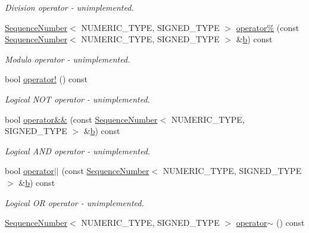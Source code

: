 \begin{DoxyCompactItemize}
\begin{DoxyCompactList}\small\item\em Division operator -\/ unimplemented. \end{DoxyCompactList}\item 
\hyperlink{classns3_1_1SequenceNumber}{Sequence\+Number}$<$ N\+U\+M\+E\+R\+I\+C\+\_\+\+T\+Y\+PE, S\+I\+G\+N\+E\+D\+\_\+\+T\+Y\+PE $>$ \hyperlink{classns3_1_1SequenceNumber_ad27e0fd1a90b3499278f7fac1d0db06f}{operator\%} (const \hyperlink{classns3_1_1SequenceNumber}{Sequence\+Number}$<$ N\+U\+M\+E\+R\+I\+C\+\_\+\+T\+Y\+PE, S\+I\+G\+N\+E\+D\+\_\+\+T\+Y\+PE $>$ \&\hyperlink{lte__pathloss_8m_a21ad0bd836b90d08f4cf640b4c298e7c}{b}) const 
\begin{DoxyCompactList}\small\item\em Modulo operator -\/ unimplemented. \end{DoxyCompactList}\item 
bool \hyperlink{classns3_1_1SequenceNumber_a31acb0e79a7312eaf3c673af43c63b79}{operator!} () const 
\begin{DoxyCompactList}\small\item\em Logical N\+OT operator -\/ unimplemented. \end{DoxyCompactList}\item 
bool \hyperlink{classns3_1_1SequenceNumber_a62dcb5534ac30aa137815a3ae462dc16}{operator\&\&} (const \hyperlink{classns3_1_1SequenceNumber}{Sequence\+Number}$<$ N\+U\+M\+E\+R\+I\+C\+\_\+\+T\+Y\+PE, S\+I\+G\+N\+E\+D\+\_\+\+T\+Y\+PE $>$ \&\hyperlink{lte__pathloss_8m_a21ad0bd836b90d08f4cf640b4c298e7c}{b}) const 
\begin{DoxyCompactList}\small\item\em Logical A\+ND operator -\/ unimplemented. \end{DoxyCompactList}\item 
bool \hyperlink{classns3_1_1SequenceNumber_a9a48c4ad94843cf7d5ee9f3d6580a1e8}{operator$\vert$$\vert$} (const \hyperlink{classns3_1_1SequenceNumber}{Sequence\+Number}$<$ N\+U\+M\+E\+R\+I\+C\+\_\+\+T\+Y\+PE, S\+I\+G\+N\+E\+D\+\_\+\+T\+Y\+PE $>$ \&\hyperlink{lte__pathloss_8m_a21ad0bd836b90d08f4cf640b4c298e7c}{b}) const 
\begin{DoxyCompactList}\small\item\em Logical OR operator -\/ unimplemented. \end{DoxyCompactList}\item 
\hyperlink{classns3_1_1SequenceNumber}{Sequence\+Number}$<$ N\+U\+M\+E\+R\+I\+C\+\_\+\+T\+Y\+PE, S\+I\+G\+N\+E\+D\+\_\+\+T\+Y\+PE $>$ \hyperlink{classns3_1_1SequenceNumber_aeb0e888983fa47e6e8cf38fff44530f1}{operator$\sim$} () const 

\end{DoxyCompactItemize}
